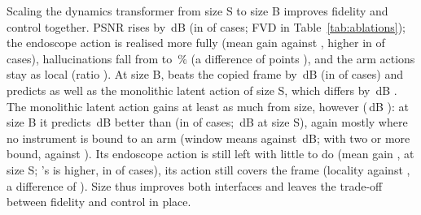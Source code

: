 Scaling the dynamics transformer from size S to size B improves fidelity and control together. PSNR rises by \,dB  (in  of  cases; FVD in Table~\ref{tab:ablations}); the endoscope action is realised more fully (mean gain  against , higher in  of  cases), hallucinations fall from  to \,\% (a difference of  points ), and the arm actions stay as local (ratio  ). At size B, \method{} beats the copied frame by \,dB  (in  of  cases) and predicts as well as the monolithic latent action of size S, which differs by \,dB . The monolithic latent action gains at least as much from size, however (\,dB ): at size B it predicts \,dB  better than \method{} (in  of  cases; \,dB at size S), again mostly where no instrument is bound to an arm (window means  against \,dB; with two or more bound,  against ). Its endoscope action is still left with little to do (mean gain ,  at size S; \method{}'s is   higher, in  of  cases), its action still covers the frame (locality  against , a difference of  ). Size thus improves both interfaces and leaves the trade-off between fidelity and control in place.

